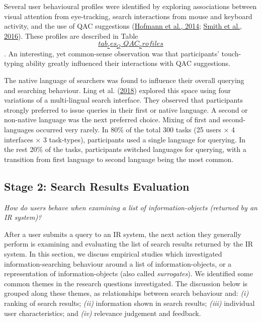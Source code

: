 \documentclass[a4paper, nobind]{templates/ociamthesis}
\begin{document}
Several user behavioural profiles were identified by exploring
associations between visual attention from eye-tracking, search
interactions from mouse and keyboard activity, and the use of QAC
suggestions (\protect\hyperlink{ref-125}{Hofmann et al., 2014}; \protect\hyperlink{ref-129}{Smith et al., 2016}). These profiles are described in
Table~\protect\hyperlink{tab_res_Q_QAC_profiles}{\[tab_res_Q\_QAC_profiles\]}. An interesting, yet common-sense
observation was that participants' touch-typing ability greatly
influenced their interactions with QAC suggestions.

The native language of searchers was found to influence their overall
querying and searching behaviour. Ling et al. (\protect\hyperlink{ref-132}{2018}) explored this space using four
variations of a multi-lingual search interface. They observed that
participants strongly preferred to issue queries in their first or
native language. A second or non-native language was the next preferred
choice. Mixing of first and second-languages occurred very rarely. In
80\% of the total 300 tasks (25 users \(\times\) 4 interfaces \(\times\) 3
task-types), participants used a single language for querying. In the
rest 20\% of the tasks, participants switched languages for querying,
with a transition from first language to second language being the most
common.

\hypertarget{sec:bg_search_list}{%
\subsection{Stage 2: Search Results Evaluation}\label{sec:bg_search_list}}

\emph{How do users behave when examining a list of information-objects
(returned by an IR system)?}

After a user submits a query to an IR system, the next action they
generally perform is examining and evaluating the list of search results
returned by the IR system. In this section, we discuss empirical studies
which investigated information-searching behaviour around a list of
information-objects, or a representation of information-objects (also
called \emph{surrogates}). We identified some common themes in the research
questions investigated. The discussion below is grouped along these
themes, as relationships between search behaviour and: \emph{(i)} ranking of
search results; \emph{(ii)} information shown in search results; \emph{(iii)}
individual user characteristics; and \emph{(iv)} relevance judgement and
feedback.
\end{document}
